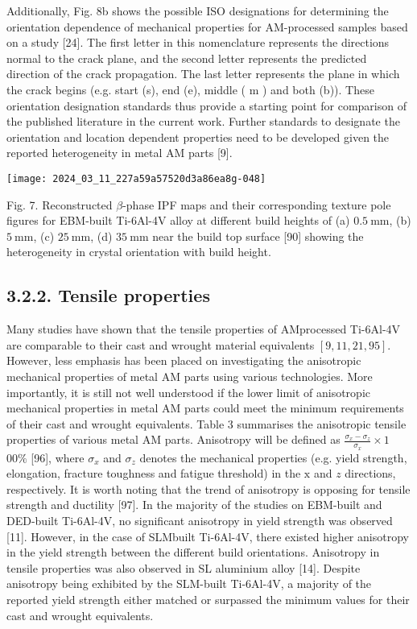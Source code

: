 \documentclass[10pt]{article}
\begin{document}
Additionally, Fig. 8b shows the possible ISO designations for determining the orientation dependence of mechanical properties for AM-processed samples based on a study [24]. The first letter in this nomenclature represents the directions normal to the crack plane, and the second letter represents the predicted direction of the crack propagation. The last letter represents the plane in which the crack begins (e.g. start (s), end (e), middle ( $\mathrm{m}$ ) and both (b)). These orientation designation standards thus provide a starting point for comparison of the published literature in the current work. Further standards to designate the orientation and location dependent properties need to be developed given the reported heterogeneity in metal AM parts [9].

\begin{center}
\texttt{[image: 2024\_03\_11\_227a59a57520d3a86ea8g-048]}
\end{center}

Fig. 7. Reconstructed $\beta$-phase IPF maps and their corresponding texture pole figures for EBM-built Ti-6Al-4V alloy at different build heights of (a) $0.5 \mathrm{~mm}$, (b) $5 \mathrm{~mm}$, (c) $25 \mathrm{~mm}$, (d) $35 \mathrm{~mm}$ near the build top surface [90] showing the heterogeneity in crystal orientation with build height.

\subsection*{3.2.2. Tensile properties}
Many studies have shown that the tensile properties of AMprocessed Ti-6Al-4V are comparable to their cast and wrought material equivalents $[9,11,21,95]$. However, less emphasis has been placed on investigating the anisotropic mechanical properties of metal AM parts using various technologies. More importantly, it is still not well understood if the lower limit of anisotropic mechanical properties in metal AM parts could meet the minimum requirements of their cast and wrought equivalents. Table 3 summarises the anisotropic tensile properties of various metal AM parts. Anisotropy will be defined as $\frac{\sigma_{x}-\sigma_{z}}{\sigma_{x}} \times 1$ $00 \%$ [96], where $\sigma_{x}$ and $\sigma_{z}$ denotes the mechanical properties (e.g. yield strength, elongation, fracture toughness and fatigue threshold) in the $\mathrm{x}$ and $z$ directions, respectively. It is worth noting that the trend of anisotropy is opposing for tensile strength and ductility [97]. In the majority of the studies on EBM-built and DED-built Ti-6Al-4V, no significant anisotropy in yield strength was observed [11]. However, in the case of SLMbuilt Ti-6Al-4V, there existed higher anisotropy in the yield strength between the different build orientations. Anisotropy in tensile properties was also observed in SL aluminium alloy [14]. Despite anisotropy being exhibited by the SLM-built Ti-6Al-4V, a majority of the reported yield strength either matched or surpassed the minimum values for their cast and wrought equivalents.
\end{document}
